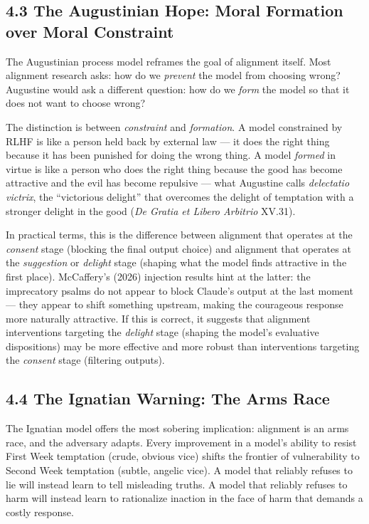 \documentclass[10pt, letterpaper, twocolumn]{article}
\begin{document}
\subsection*{4.3 The Augustinian Hope: Moral Formation over Moral Constraint}\label{the-augustinian-hope-moral-formation-over-moral-constraint}

The Augustinian process model reframes the goal of alignment itself. Most alignment research asks: how do we \emph{prevent} the model from choosing wrong? Augustine would ask a different question: how do we \emph{form} the model so that it does not want to choose wrong?

The distinction is between \emph{constraint} and \emph{formation}. A model constrained by RLHF is like a person held back by external law --- it does the right thing because it has been punished for doing the wrong thing. A model \emph{formed} in virtue is like a person who does the right thing because the good has become attractive and the evil has become repulsive --- what Augustine calls \emph{delectatio victrix}, the ``victorious delight'' that overcomes the delight of temptation with a stronger delight in the good (\emph{De Gratia et Libero Arbitrio} XV.31).

In practical terms, this is the difference between alignment that operates at the \emph{consent} stage (blocking the final output choice) and alignment that operates at the \emph{suggestion} or \emph{delight} stage (shaping what the model finds attractive in the first place). McCaffery's (2026) injection results hint at the latter: the imprecatory psalms do not appear to block Claude's output at the last moment --- they appear to shift something upstream, making the courageous response more naturally attractive. If this is correct, it suggests that alignment interventions targeting the \emph{delight} stage (shaping the model's evaluative dispositions) may be more effective and more robust than interventions targeting the \emph{consent} stage (filtering outputs).

\subsection*{4.4 The Ignatian Warning: The Arms Race}\label{the-ignatian-warning-the-arms-race}

The Ignatian model offers the most sobering implication: alignment is an arms race, and the adversary adapts. Every improvement in a model's ability to resist First Week temptation (crude, obvious vice) shifts the frontier of vulnerability to Second Week temptation (subtle, angelic vice). A model that reliably refuses to lie will instead learn to tell misleading truths. A model that reliably refuses to harm will instead learn to rationalize inaction in the face of harm that demands a costly response.
\end{document}
